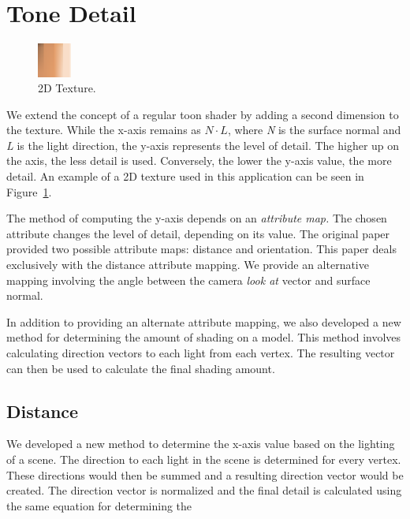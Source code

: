 \documentclass[annual]{acmsiggraph}
\begin{document}
\section{Tone Detail}
\label{sec:tonedetail}
\begin{figure}
  \vspace{-20pt}
  \begin{center}
    \includegraphics[width=0.1\textwidth]{images/xtoon_skin}
  \end{center}
  \caption{2D Texture.}
  \vspace{-10pt}
  \label{fig:2dtexture}
\end{figure}
We extend the concept of a regular toon shader by adding a second dimension to the texture. While the x-axis remains as $N\cdot L$, where {\it{N}} is the surface normal and {\it{L}} is the light direction, the y-axis represents the level of detail. The higher up on the axis, the less detail is used. Conversely, the lower the y-axis value, the more detail. An example of a 2D texture used in this application can be seen in Figure~\ref{fig:2dtexture}.

The method of computing the y-axis depends on an {\it{attribute map.}} The chosen attribute changes the level of detail, depending on its value. The original paper provided two possible attribute maps: distance and orientation. This paper deals exclusively with the distance attribute mapping. We provide an alternative mapping involving the angle between the camera {\it{look at}} vector and surface normal. 

In addition to providing an alternate attribute mapping, we also developed a new method for determining the amount of shading on a model. This method involves calculating direction vectors to each light from each vertex. The resulting vector can then be used to calculate the final shading amount.

\subsection{Distance}
We developed a new method to determine the x-axis value based on the lighting of a scene. The direction to each light in the scene is determined for every vertex. These directions would then be summed and a resulting direction vector would be created. The direction vector is normalized and the final detail is calculated using the same equation for determining the 
\end{document}
